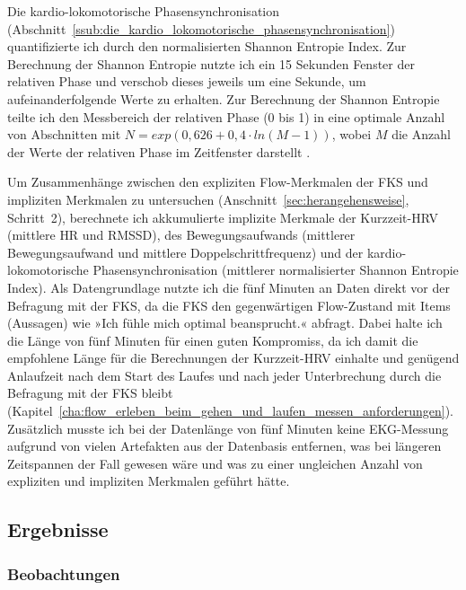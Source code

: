Die kardio-lokomotorische Phasensynchronisation (Abschnitt~\ref{ssub:die_kardio_lokomotorische_phasensynchronisation}) quantifizierte ich durch den normalisierten Shannon Entropie Index. Zur Berechnung der Shannon Entropie nutzte ich ein 15 Sekunden Fenster der relativen Phase und verschob dieses jeweils um eine Sekunde, um aufeinanderfolgende Werte zu erhalten. Zur Berechnung der Shannon Entropie teilte ich den Messbereich der relativen Phase (0 bis 1) in eine optimale Anzahl von Abschnitten mit $N = exp(0{,}626 + 0{,}4 \cdot ln(M-1))$, wobei $M$ die Anzahl der Werte der relativen Phase im Zeitfenster darstellt \citep[][S.~20]{Rosenblum2003}.

Um Zusammenhänge zwischen den expliziten Flow-Merkmalen der \ac{FKS} und impliziten Merkmalen zu untersuchen (Anschnitt~\ref{sec:herangehensweise}, Schritt~2), berechnete ich akkumulierte implizite Merkmale der Kurzzeit-\ac{HRV} (mittlere \ac{HR} und \acs{RMSSD}), des Bewegungsaufwands (mittlerer Bewegungsaufwand und mittlere Doppelschrittfrequenz) und der kardio-lokomotorische Phasensynchronisation (mittlerer normalisierter Shannon Entropie Index). Als Datengrundlage nutzte ich die fünf Minuten an Daten direkt vor der Befragung mit der \ac{FKS}, da die \ac{FKS} den gegenwärtigen Flow-Zustand mit Items (Aussagen) wie »Ich fühle mich optimal beansprucht.« abfragt. Dabei halte ich die Länge von fünf Minuten für einen guten Kompromiss, da ich damit die empfohlene Länge für die Berechnungen der Kurzzeit-\ac{HRV} \citep[][S.~360]{TaskForce1996} einhalte und genügend Anlaufzeit nach dem Start des Laufes und nach jeder Unterbrechung durch die Befragung mit der \ac{FKS} bleibt (Kapitel~\ref{cha:flow_erleben_beim_gehen_und_laufen_messen_anforderungen}). Zusätzlich musste ich bei der Datenlänge von fünf Minuten keine \ac{EKG}-Messung aufgrund von vielen Artefakten aus der Datenbasis entfernen, was bei längeren Zeitspannen der Fall gewesen wäre und was zu einer ungleichen Anzahl von expliziten und impliziten Merkmalen geführt hätte.

\subsection{Ergebnisse} 

\label{sub:ergebnisse_5_1}

\subsubsection{Beobachtungen} 

